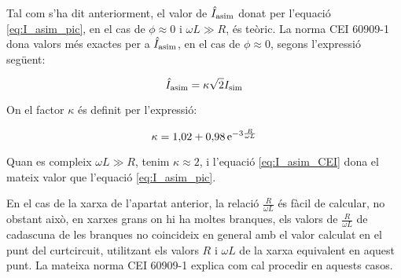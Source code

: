 Tal com s'ha dit anteriorment, el valor de $\hat{I}_\mathrm{asim}$ donat per l'equació \eqref{eq:I_asim_pic}, en el cas de $\phi \approx 0$ i $\omega L\gg R$, és teòric. La norma CEI 60909-1 dona valors més exactes per a $\hat{I}_\mathrm{asim}$, en el cas de $\phi \approx 0$, segons l'expressió següent:

\begin{equation}
    \hat{I}_\mathrm{asim} = \kappa \sqrt{2} I_\mathrm{sim} \label{eq:I_asim_CEI}
\end{equation}

On el factor $\kappa$ és definit per l'expressió:

\begin{equation}
    \kappa = 1{,}02 + 0{,}98 \,\mathrm{e}^{-3\frac{R}{\omega L}}\label{eq:kappa_CEI}
\end{equation}

Quan es compleix $\omega L\gg R$, tenim $\kappa \approx 2$, i l'equació \eqref{eq:I_asim_CEI} dona el mateix valor que l'equació \eqref{eq:I_asim_pic}.

En el cas de la xarxa de l'apartat anterior, la relació $\frac{R}{\omega L}$ és fàcil de  calcular, no obstant això, en xarxes grans on hi ha moltes branques, els valors de $\frac{R}{\omega L}$ de cadascuna de les branques no coincideix en general amb el valor calculat en el punt del curtcircuit, utilitzant els valors $R$ i $\omega L$ de la xarxa equivalent en aquest punt. La mateixa norma CEI 60909-1 explica com cal procedir en aquests casos.


